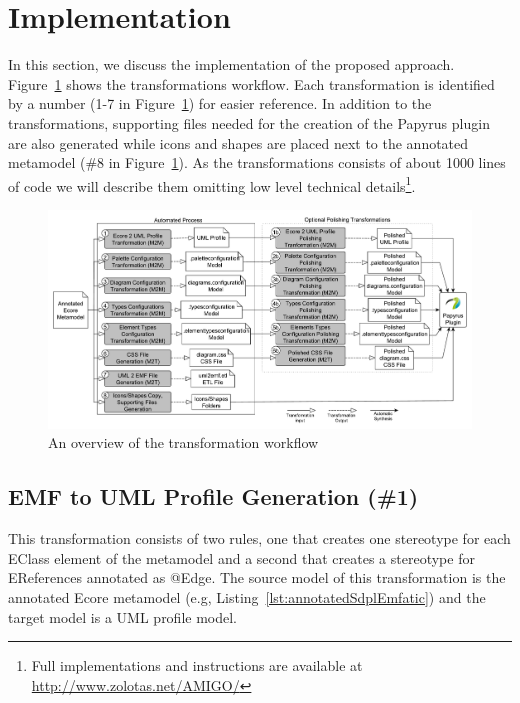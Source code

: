 \section{Implementation}
\label{sec:implementation}
In this section, we discuss the implementation of the proposed approach. 
Figure~\ref{fig:transformationWorkflow} shows the transformations workflow. Each transformation is identified by a number (1-7 in Figure~\ref{fig:transformationWorkflow}) for easier reference. 
In addition to the transformations, supporting files needed for the creation of the Papyrus plugin are also generated while icons and shapes are placed next to the annotated metamodel (\#8 in Figure~\ref{fig:transformationWorkflow}). 
As the transformations consists of about 1000 lines of code we will describe them omitting low level technical details\footnote{Full implementations and instructions are available at \url{http://www.zolotas.net/AMIGO/}}. 

\begin{figure}[t]
	\centering
	\includegraphics[width=1	\textwidth]{diagrams/transformationWorkflow.pdf}
	\caption[]{An overview of the transformation workflow}
	\label{fig:transformationWorkflow}
	\vspace*{-3mm}
\end{figure}

\subsection{EMF to UML Profile Generation (\#1)}
\label{sec:profileGeneration}
This transformation consists of two rules, one that creates one stereotype for each EClass element of the metamodel and a second that creates a stereotype for EReferences annotated as @Edge. 
The source model of this transformation is the annotated Ecore metamodel (e.g,  Listing~\ref{lst:annotatedSdplEmfatic}) and the target model is a UML profile model.

